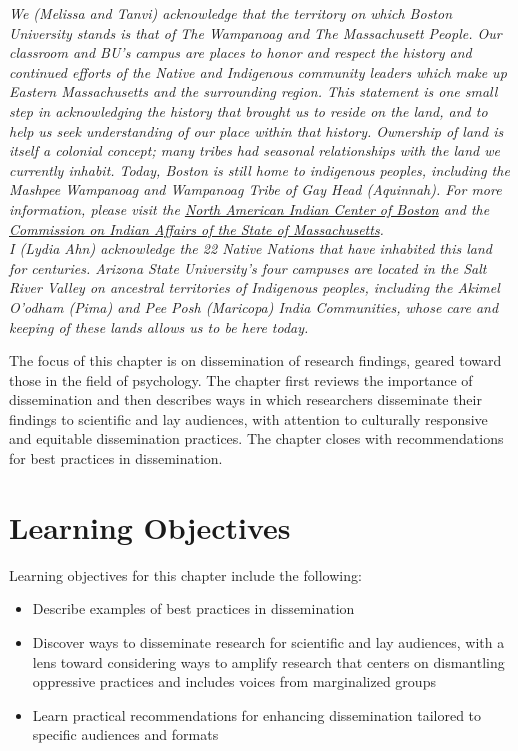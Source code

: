 \documentclass[
  11pt,
]{book}
\providecommand{\tightlist}{%
  \setlength{\itemsep}{0pt}\setlength{\parskip}{0pt}}
\begin{document}
\emph{We (Melissa and Tanvi) acknowledge that the territory on which Boston University stands is that of The Wampanoag and The Massachusett People. Our classroom and BU's campus are places to honor and respect the history and continued efforts of the Native and Indigenous community leaders which make up Eastern Massachusetts and the surrounding region. This statement is one small step in acknowledging the history that brought us to reside on the land, and to help us seek understanding of our place within that history. Ownership of land is itself a colonial concept; many tribes had seasonal relationships with the land we currently inhabit. Today, Boston is still home to indigenous peoples, including the Mashpee Wampanoag and Wampanoag Tribe of Gay Head (Aquinnah). For more information, please visit the \href{http://www.naicob.org/}{North American Indian Center of Boston} and the \href{https://www.mass.gov/service-details/indian-affairs}{Commission on Indian Affairs of the State of Massachusetts}.}\\

\emph{I (Lydia Ahn) acknowledge the 22 Native Nations that have inhabited this land for centuries. Arizona State University's four campuses are located in the Salt River Valley on ancestral territories of Indigenous peoples, including the Akimel O'odham (Pima) and Pee Posh (Maricopa) India Communities, whose care and keeping of these lands allows us to be here today.}~

The focus of this chapter is on dissemination of research findings, geared toward those in the field of psychology. The chapter first reviews the importance of dissemination and then describes ways in which researchers disseminate their findings to scientific and lay audiences, with attention to culturally responsive and equitable dissemination practices. The chapter closes with recommendations for best practices in dissemination.

\section{Learning Objectives}\label{learning-objectives-3}

Learning objectives for this chapter include the following:

\begin{itemize}
\tightlist
\item
  Describe examples of best practices in dissemination
\item
  Discover ways to disseminate research for scientific and lay audiences, with a lens toward considering ways to amplify research that centers on dismantling oppressive practices and includes voices from marginalized groups
\item
  Learn practical recommendations for enhancing dissemination tailored to specific audiences and formats
\end{itemize}
\end{document}
